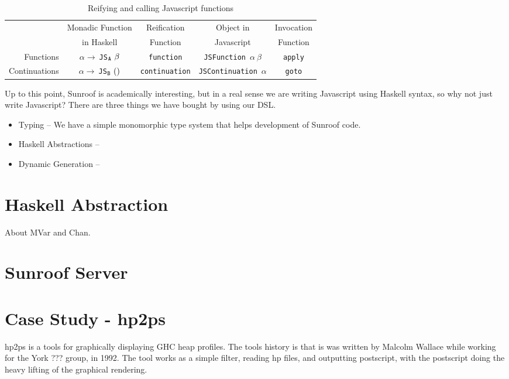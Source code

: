 \documentclass{llncs}
\newcommand{\Src}[1]{{\tt{#1}}}
\begin{document}
\begin{table}
\caption{Reifying and calling Javascript functions}
\begin{center}
\begin{tabular}{r@{\quad}c@{\quad}c@{\quad}c@{\quad}c}
\hline\rule{0pt}{12pt}%

                & Monadic Function      & Reification   & Object in     & Invocation\\
                & in Haskell            & Function      & Javascript    & Function\\
\hline\rule{0pt}{12pt}%
  Functions
  & $\alpha\rightarrow\ $\Src{JS}$_\Src{A}~\beta$
  & \Src{function}
  & \Src{JSFunction}~$\alpha~\beta$
  & \Src{apply} \\
  Continuations
  & $\alpha\rightarrow\ $\Src{JS}$_\Src{B}~\Src{()}$
  & \Src{continuation}
  & \Src{JSContinuation}~$\alpha$
  & \Src{goto}\\
\hline
\end{tabular}
\end{center}
\end{table} 

Up to this point, Sunroof is academically interesting, but in a real sense
we are writing Javascript using Haskell syntax, so why not just write
Javascript? There are three things we have bought by using our DSL.
\begin{itemize}
\item Typing -- We have a simple monomorphic type system that helps development of Sunroof code.
\item Haskell Abstractions --
\item Dynamic Generation -- 
\end{itemize}

\section{Haskell Abstraction}

About MVar and Chan.

\section{Sunroof Server}



\section{Case Study - hp2ps}

hp2ps is a tools for graphically displaying GHC heap profiles.
The tools history is that is was written by Malcolm Wallace while working
for the York ??? group, in 1992. The tool works as a simple filter,
reading hp files, and outputting postscript, with the postscript
doing the heavy lifting of the graphical rendering.
\end{document}

